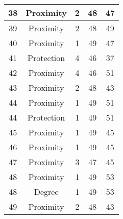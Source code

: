\documentclass[results.tex]{subfiles}
\begin{document}
\begin{center}
\begin{tabular}{| c || c | c | c | c |}
            \hline
            38                      & Proximity                    & 2                      & 48                      & 47                   \\
            \hline
            39                      & Proximity                    & 2                      & 48                      & 49                   \\
            \hline
            40                      & Proximity                    & 1                      & 49                      & 47                   \\
            \hline
            41                      & Protection                   & 4                      & 46                      & 37                   \\
            \hline
            42                      & Proximity                    & 4                      & 46                      & 51                   \\
            \hline
            43                      & Proximity                    & 2                      & 48                      & 43                   \\
            \hline
            44                      & Proximity                    & 1                      & 49                      & 51                   \\
            \hline
            44                      & Protection                   & 1                      & 49                      & 51                   \\
            \hline
            45                      & Proximity                    & 1                      & 49                      & 45                   \\
            \hline
            46                      & Proximity                    & 1                      & 49                      & 45                   \\
            \hline
            47                      & Proximity                    & 3                      & 47                      & 45                   \\
            \hline
            48                      & Proximity                    & 1                      & 49                      & 53                   \\
            \hline
            48                      & Degree                       & 1                      & 49                      & 53                   \\
            \hline
            49                      & Proximity                    & 2                      & 48                      & 43                   \\
            \hline
        \end{tabular}
    \end{center}
\end{document}
